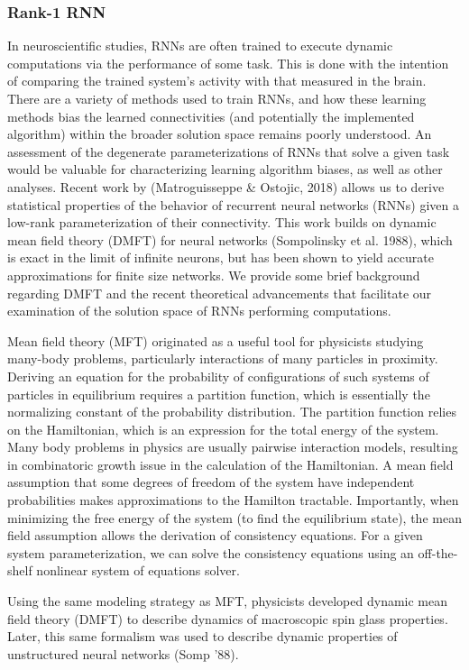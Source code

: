 \documentclass[11pt]{article}
\begin{document}
\subsubsection{Rank-1 RNN}
In neuroscientific studies, RNNs are often trained to execute dynamic computations via the performance of some task.  This is done with the intention of comparing the trained system's activity with that measured in the brain. There are a variety of methods used to train RNNs, and how these learning methods bias the learned connectivities (and potentially the implemented algorithm) within the broader solution space remains poorly understood. An assessment of the degenerate parameterizations of RNNs that solve a given task would be valuable for characterizing learning algorithm biases, as well as other analyses.  Recent work by (Matroguisseppe \& Ostojic, 2018) allows us to derive statistical properties of the behavior of recurrent neural networks (RNNs) given a low-rank parameterization of their connectivity.  This work builds on dynamic mean field theory (DMFT) for neural networks (Sompolinsky et al. 1988), which is exact in the limit of infinite neurons, but has been shown to yield accurate approximations for finite size networks.  We provide some brief background regarding DMFT and the recent theoretical advancements that facilitate our examination of the solution space of RNNs performing computations.

Mean field theory (MFT) originated as a useful tool for physicists studying many-body problems, particularly interactions of many particles in proximity.  Deriving an equation for the probability of configurations of such systems of particles in equilibrium requires a partition function, which is essentially the normalizing constant of the probability distribution.  The partition function relies on the Hamiltonian, which is an expression for the total energy of the system.  Many body problems in physics are usually pairwise interaction models, resulting in  combinatoric growth issue in the calculation of the Hamiltonian.  A mean field assumption that some degrees of freedom of the system have independent probabilities makes approximations to the Hamilton tractable.  Importantly, when minimizing the free energy of the system (to find the equilibrium state), the mean field assumption allows the derivation of consistency equations.  For a given system parameterization, we can solve the consistency equations using an off-the-shelf nonlinear system of equations solver.

Using the same modeling strategy as MFT, physicists developed dynamic mean field theory (DMFT) to describe dynamics of macroscopic spin glass properties. Later, this same formalism was used to describe dynamic properties of unstructured neural networks (Somp ’88).
\end{document}
